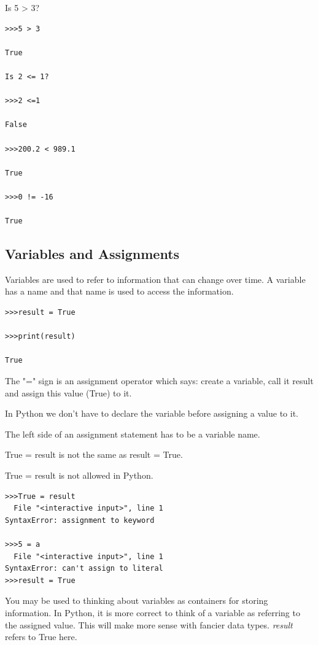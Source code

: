 \documentclass{article}
\begin{document}
Is 5 > 3?

\begin{lstlisting}
>>>5 > 3

True

Is 2 <= 1?

>>>2 <=1

False

>>>200.2 < 989.1

True

>>>0 != -16

True

\end{lstlisting}

\subsection{Variables and Assignments}

Variables are used to refer to information that can change over time.  A variable has a name and that name is used to access the information.

\begin{lstlisting}
>>>result = True

>>>print(result)

True

\end{lstlisting}

The "=" sign is an assignment operator which says: create a variable, call it result and assign this value (True) to it.  

In Python we don't have to declare the variable before assigning a value to it.

The left side of an assignment statement has to be a variable name.

True = result is not the same as result = True.

True = result is not allowed in Python.

 \begin{lstlisting}
>>>True = result
  File "<interactive input>", line 1
SyntaxError: assignment to keyword
 
>>>5 = a
  File "<interactive input>", line 1
SyntaxError: can't assign to literal
>>>result = True
\end{lstlisting}

You may be used to thinking about variables as containers for storing information. In Python, it is more correct to think of a variable as referring to the assigned value.  This will make more sense with fancier data types.  \textit{result} refers to True here.
\end{document}
